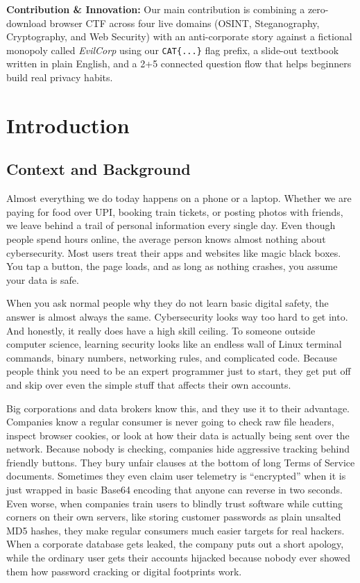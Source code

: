 \documentclass[11pt,a4paper]{article}
\begin{document}
\noindent
\textbf{Contribution \& Innovation:} Our main contribution is combining a zero-download browser CTF across four live domains (OSINT, Steganography, Cryptography, and Web Security) with an anti-corporate story against a fictional monopoly called \textit{EvilCorp} using our \texttt{CAT\{...\}} flag prefix, a slide-out textbook written in plain English, and a 2+5 connected question flow that helps beginners build real privacy habits.

\vspace{1em}

\clearpage

\section{Introduction}

\subsection{Context and Background}
Almost everything we do today happens on a phone or a laptop. Whether we are paying for food over UPI, booking train tickets, or posting photos with friends, we leave behind a trail of personal information every single day. Even though people spend hours online, the average person knows almost nothing about cybersecurity. Most users treat their apps and websites like magic black boxes. You tap a button, the page loads, and as long as nothing crashes, you assume your data is safe.

When you ask normal people why they do not learn basic digital safety, the answer is almost always the same. Cybersecurity looks way too hard to get into. And honestly, it really does have a high skill ceiling. To someone outside computer science, learning security looks like an endless wall of Linux terminal commands, binary numbers, networking rules, and complicated code. Because people think you need to be an expert programmer just to start, they get put off and skip over even the simple stuff that affects their own accounts.

Big corporations and data brokers know this, and they use it to their advantage. Companies know a regular consumer is never going to check raw file headers, inspect browser cookies, or look at how their data is actually being sent over the network. Because nobody is checking, companies hide aggressive tracking behind friendly buttons. They bury unfair clauses at the bottom of long Terms of Service documents. Sometimes they even claim user telemetry is ``encrypted'' when it is just wrapped in basic Base64 encoding that anyone can reverse in two seconds. Even worse, when companies train users to blindly trust software while cutting corners on their own servers, like storing customer passwords as plain unsalted MD5 hashes, they make regular consumers much easier targets for real hackers. When a corporate database gets leaked, the company puts out a short apology, while the ordinary user gets their accounts hijacked because nobody ever showed them how password cracking or digital footprints work.
\end{document}
